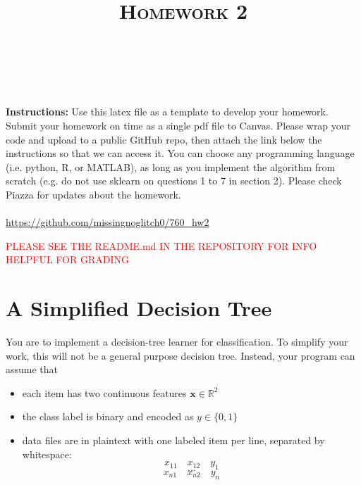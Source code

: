 \documentclass[a4paper]{article}
\title{\textsc{Homework 2}} %
\author{
\red{$>>$Martin Diges$<<$} \\
\red{$>>$9080689699$<<$}\\
}
\date{}
\theoremstyle{definition}
\newcommand{\RR}{\mathbb{R}}
\newcommand{\red}[1]{\textcolor{red}{#1}}
\def\x{\mathbf x}
\begin{document}
\maketitle 


\textbf{Instructions:} 
Use this latex file as a template to develop your homework. Submit your homework on time as a single pdf file to Canvas. Please wrap your code and upload to a public GitHub repo, then attach the link below the instructions so that we can access it. You can choose any programming language (i.e. python, R, or MATLAB), as long as you implement the algorithm from scratch (e.g. do not use sklearn on questions 1 to 7 in section 2). Please check Piazza for updates about the homework.
\\\\
\hypersetup{colorlinks=true, linkcolor=cyan}
\url{https://github.com/missingnoglitch0/760_hw2}

\red{PLEASE SEE THE README.md IN THE REPOSITORY FOR INFO HELPFUL FOR GRADING}

\section{A Simplified Decision Tree}
You are to implement a decision-tree learner for classification.
To simplify your work, this will not be a general purpose decision tree.  Instead, your program can assume that
\begin{itemize}
\item each item has two continuous features $\x \in \RR^2$
\item the class label is binary and encoded as $y \in \{0,1\}$
\item data files are in plaintext with one labeled item per line, separated by whitespace:
$$x_{11} \quad x_{12} \quad y_1$$
$$...$$
$$x_{n1} \quad x_{n2} \quad y_n$$
\end{itemize}
\end{document}
